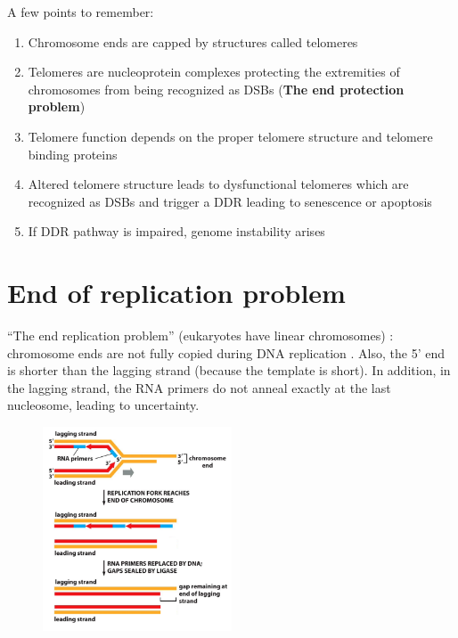 A few points to remember:

\begin{enumerate}
\def\labelenumi{\arabic{enumi}.}
\tightlist
\item
  Chromosome ends are capped by structures called telomeres
\item
  Telomeres are nucleoprotein complexes protecting the extremities of
  chromosomes from being recognized as DSBs (\textbf{The end protection
  problem})
\item
  Telomere function depends on the proper telomere structure and
  telomere binding proteins
\item
  Altered telomere structure leads to dysfunctional telomeres which are
  recognized as DSBs and trigger a DDR leading to senescence or
  apoptosis
\item
  If DDR pathway is impaired,  genome instability arises
\end{enumerate}

\hypertarget{end-of-replication-problem}{%
\section{End of replication problem}\label{end-of-replication-problem}}

``The end replication problem'' (eukaryotes have linear chromosomes) :
chromosome ends are not fully copied during DNA replication . Also, the
5' end is shorter than the lagging strand (because the template is
short). In addition, in the lagging strand, the RNA primers do not
anneal exactly at the last nucleosome, leading to uncertainty.

\begin{figure}
\centering
\includegraphics[width=0.5\textwidth]{../_resources/Screen_Shot_2022-12-15_at_18-00-30.png}
\caption{}
\end{figure}

